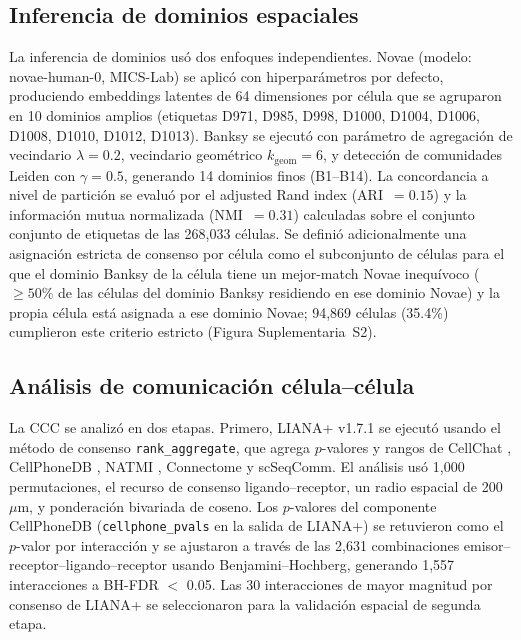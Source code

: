 \documentclass[12pt,a4paper]{article}
\begin{document}
\subsection*{Inferencia de dominios espaciales}
La inferencia de dominios usó dos enfoques independientes. Novae \citep{schaar2025novae} (modelo: novae-human-0, MICS-Lab) se aplicó con hiperparámetros por defecto, produciendo embeddings latentes de 64 dimensiones por célula que se agruparon en 10 dominios amplios (etiquetas D971, D985, D998, D1000, D1004, D1006, D1008, D1010, D1012, D1013). Banksy \citep{zhao2023banksy} se ejecutó con parámetro de agregación de vecindario $\lambda = 0.2$, vecindario geométrico $k_{\text{geom}} = 6$, y detección de comunidades Leiden con $\gamma = 0.5$, generando 14 dominios finos (B1--B14). La concordancia a nivel de partición se evaluó por el adjusted Rand index (ARI~$=0.15$) y la información mutua normalizada (NMI~$=0.31$) calculadas sobre el conjunto conjunto de etiquetas de las 268,033 células. Se definió adicionalmente una asignación estricta de consenso por célula como el subconjunto de células para el que el dominio Banksy de la célula tiene un mejor-match Novae inequívoco ($\geq 50\%$ de las células del dominio Banksy residiendo en ese dominio Novae) y la propia célula está asignada a ese dominio Novae; 94,869 células (35.4\%) cumplieron este criterio estricto (Figura Suplementaria~S2).

\subsection*{Análisis de comunicación célula--célula}
La CCC se analizó en dos etapas. Primero, LIANA+ \citep{ramirez2024liana} v1.7.1 se ejecutó usando el método de consenso \texttt{rank\_aggregate}, que agrega $p$-valores y rangos de CellChat \citep{jin2021inference}, CellPhoneDB \citep{efremova2020cellphonedb}, NATMI \citep{hou2020predicting}, Connectome y scSeqComm. El análisis usó 1,000 permutaciones, el recurso de consenso ligando--receptor, un radio espacial de 200~$\mu$m, y ponderación bivariada de coseno. Los $p$-valores del componente CellPhoneDB (\texttt{cellphone\_pvals} en la salida de LIANA+) se retuvieron como el $p$-valor por interacción y se ajustaron a través de las 2,631 combinaciones emisor--receptor--ligando--receptor usando Benjamini--Hochberg, generando 1,557 interacciones a BH-FDR $<$ 0.05. Las 30 interacciones de mayor magnitud por consenso de LIANA+ se seleccionaron para la validación espacial de segunda etapa.
\end{document}
